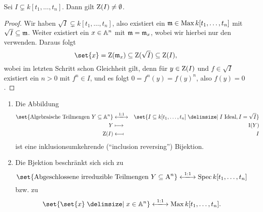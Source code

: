 \documentclass[12pt,a4paper]{scrartcl}
\theoremstyle{cplain}
\theoremstyle{cdef}
\begin{document}
\begin{bem}
	Sei $I\subsetneq k[t_1,\dots, t_n]$. Dann gilt $\operatorname{Z}(I)\neq \emptyset$.
	\begin{proof}
		Wir haben $\sqrt{I}\subsetneq k[t_1,\dots, t_n]$, also existiert ein $\mathfrak{m}\in\operatorname{Max} k[t_1,\dots, t_n]$ mit $\sqrt{I} \subseteq \mathfrak{m}$. Weiter existiert ein $x\in\mathbb A^n$ mit $\mathfrak{m} = \mathfrak{m}_x$, wobei wir hierbei nur den  verwenden.  Daraus folgt
		\[\set{x} = \Z(\fm_x) \subseteq \Z(\sqrt{I}) \subseteq \Z(I),\]
		wobei im letzten Schritt schon Gleichheit gilt, denn für $y\in \operatorname{Z}(I)$ und $f\in\sqrt {I}$ existiert ein $n>0$ mit $f^n\in I$, und es folgt $0 = f^n(y) = f(y)^n$, also $f(y) = 0$.
	\end{proof}
\end{bem}
\begin{kor} \label{kor:8.14}
	\leavevmode
	\begin{enumerate}
		\item \label{kor:8.14:i} Die Abbildung
		\begin{eqnarray*}
			\set{\text{Algebraische Teilmengen }Y\subseteq \IA^n}&\xlongleftrightarrow{1:1}&\set{I\subseteq k[t_1,\dots, t_n]\given I\text{ Ideal}, I = \sqrt{I}} \\
			Y &\longmapsto& \I(Y) \\
			\Z(I) &\longmapsfrom& I
		\end{eqnarray*}
		ist eine inklusionsumkehrende \textup(\enquote{inclusion reversing}\textup) Bijektion.
		\item \label{kor:8.14:ii} Die Bjektion beschränkt sich sich zu
		\[\set{\text{Abgeschlossene irreduzible Teilmengen }Y\subseteq \A^n}  \xlongleftrightarrow{1:1}\Spec k[t_1,\dots, t_n]\]
		bzw. zu 
		\[\set{\set{x}\given x\in\IA^n}\xlongleftrightarrow{1:1}\Max k[t_1,\dots, t_n].\]
	\end{enumerate}
\end{kor}
\end{document}
